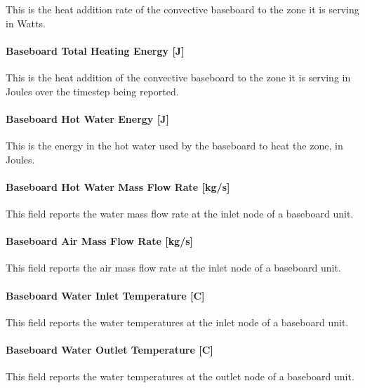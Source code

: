 This is the heat addition rate of the convective baseboard to the zone it is serving in Watts.

\paragraph{Baseboard Total Heating Energy {[}J{]}}\label{baseboard-total-heating-energy-j-3}

This is the heat addition of the convective baseboard to the zone it is serving in Joules over the timestep being reported.

\paragraph{Baseboard Hot Water Energy {[}J{]}}\label{baseboard-hot-water-energy-j}

This is the energy in the hot water used by the baseboard to heat the zone, in Joules.

\paragraph{Baseboard Hot Water Mass Flow Rate {[}kg/s{]}}\label{baseboard-hot-water-mass-flow-rate-kgs-1}

This field reports the water mass flow rate at the inlet node of a baseboard unit.

\paragraph{Baseboard Air Mass Flow Rate {[}kg/s{]}}\label{baseboard-air-mass-flow-rate-kgs-1}

This field reports the air mass flow rate at the inlet node of a baseboard unit.

\paragraph{Baseboard Water Inlet Temperature {[}C{]}}\label{baseboard-water-inlet-temperature-c-1}

This field reports the water temperatures at the inlet node of a baseboard unit.

\paragraph{Baseboard Water Outlet Temperature {[}C{]}}\label{baseboard-water-outlet-temperature-c-1}

This field reports the water temperatures at the outlet node of a baseboard unit.

